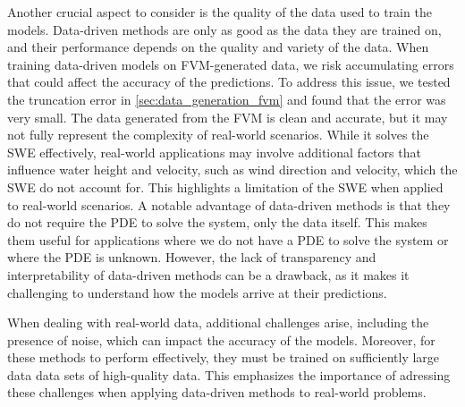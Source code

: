 Another crucial aspect to consider is the quality of the data used to train the models.
Data-driven methods are only as good as the data they are trained on, and their performance depends on the quality and variety of the data.
When training data-driven models on FVM-generated data, we risk accumulating errors that could affect the accuracy of the predictions.
To address this issue, we tested the truncation error in \autoref{sec:data_generation_fvm} and found that the error was very small.
The data generated from the FVM is clean and accurate, but it may not fully represent the complexity of real-world scenarios.
While it solves the SWE effectively, real-world applications may involve additional factors that influence water height and velocity, such as wind direction and velocity, which the SWE do not account for.
This highlights a limitation of the SWE when applied to real-world scenarios.
A notable advantage of data-driven methods is that they do not require the PDE to solve the system, only the data itself.
This makes them useful for applications where we do not have a PDE to solve the system or where the PDE is unknown.
However, the lack of transparency and interpretability of data-driven methods can be a drawback, as it makes it challenging to understand how the models arrive at their predictions.

When dealing with real-world data, additional challenges arise, including the presence of noise, which can impact the accuracy of the models.
Moreover, for these methods to perform effectively, they must be trained on sufficiently large data data sets of high-quality data.
This emphasizes the importance of adressing these challenges when applying data-driven methods to real-world problems.

